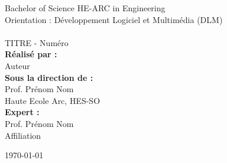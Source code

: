 \begin{titlepage}
\begin{flushright}
\huge Bachelor of Science HE-ARC in Engineering\\[0.5cm]

\large Orientation : Développement Logiciel et Multimédia (DLM)\\[0.5cm]
~\\[1cm]
{
\Huge TITRE - Numéro \\[1.5cm]
}
{
\textbf{Réalisé par :}\\
\huge Auteur\\[0.5cm]
}
{
\textbf{Sous la direction de :} \\
Prof. Prénom Nom\\
Haute Ecole Arc, HES-SO\\[0.5cm]
}
{
\textbf{Expert :} \\
Prof. Prénom Nom\\
Affiliation
}
\vfill

{\today}

\end{flushright}
\end{titlepage}
